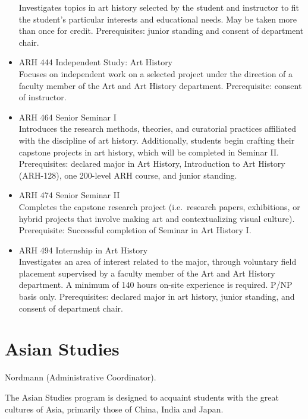 \documentclass[
  letterpaper,
]{scrbook}
\begin{document}
\begin{itemize}
  Investigates topics in art history selected by the student and
  instructor to fit the student's particular interests and educational
  needs. May be taken more than once for credit. Prerequisites: junior
  standing and consent of department chair.\\
\item
  ARH 444 Independent Study: Art History\\
  Focuses on independent work on a selected project under the direction
  of a faculty member of the Art and Art History department.
  Prerequisite: consent of instructor.\\
\item
  ARH 464 Senior Seminar I\\
  Introduces the research methods, theories, and curatorial practices
  affiliated with the discipline of art history. Additionally, students
  begin crafting their capstone projects in art history, which will be
  completed in Seminar II. Prerequisites: declared major in Art History,
  Introduction to Art History (ARH-128), one 200-level ARH course, and
  junior standing.\\
\item
  ARH 474 Senior Seminar II\\
  Completes the capstone research project (i.e.~research papers,
  exhibitions, or hybrid projects that involve making art and
  contextualizing visual culture). Prerequisite: Successful completion
  of Seminar in Art History I.\\
\item
  ARH 494 Internship in Art History\\
  Investigates an area of interest related to the major, through
  voluntary field placement supervised by a faculty member of the Art
  and Art History department. A minimum of 140 hours on-site experience
  is required. P/NP basis only. Prerequisites: declared major in art
  history, junior standing, and consent of department chair.
\end{itemize}

\section{Asian Studies}\label{sec-asian-studies}

Nordmann (Administrative Coordinator).

The Asian Studies program is designed to acquaint students with the
great cultures of Asia, primarily those of China, India and Japan.
\end{document}
